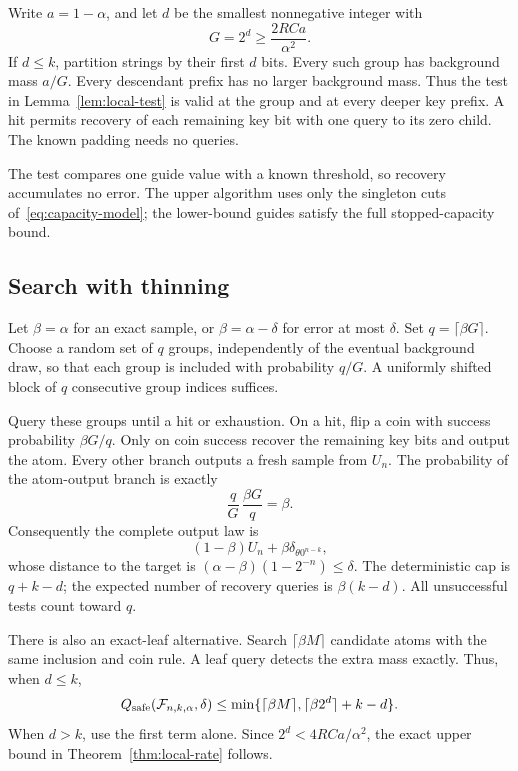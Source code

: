 Write $a=1-\alpha$, and let $d$ be the smallest nonnegative integer with
\begin{equation}\label{eq:resolution}
 G=2^d\ge \frac{2RCa}{\alpha^2}.
\end{equation}
If $d\le k$, partition strings by their first $d$ bits. Every such group has background mass $a/G$. Every descendant prefix has no larger background mass. Thus the test in Lemma~\ref{lem:local-test} is valid at the group and at every deeper key prefix. A hit permits recovery of each remaining key bit with one query to its zero child. The known padding needs no queries.

The test compares one guide value with a known threshold, so recovery accumulates no error. The upper algorithm uses only the singleton cuts of~\eqref{eq:capacity-model}; the lower-bound guides satisfy the full stopped-capacity bound.

\subsection{Search with thinning}
Let $\beta=\alpha$ for an exact sample, or $\beta=\alpha-\delta$ for error at most $\delta$. Set $q=\lceil\beta G\rceil$. Choose a random set of $q$ groups, independently of the eventual background draw, so that each group is included with probability $q/G$. A uniformly shifted block of $q$ consecutive group indices suffices.

Query these groups until a hit or exhaustion. On a hit, flip a coin with success probability $\beta G/q$. Only on coin success recover the remaining key bits and output the atom. Every other branch outputs a fresh sample from $U_n$. The probability of the atom-output branch is exactly
\begin{equation}\label{eq:branch-balance}
 \frac qG\,\frac{\beta G}{q}=\beta.
\end{equation}
Consequently the complete output law is
\begin{equation}\label{eq:local-output}
 (1-\beta)U_n+\beta\delta_{\theta0^{n-k}},
\end{equation}
whose distance to the target is $(\alpha-\beta)(1-2^{-n})\le\delta$. The deterministic cap is $q+k-d$; the expected number of recovery queries is $\beta(k-d)$. All unsuccessful tests count toward $q$.

There is also an exact-leaf alternative. Search $\lceil\beta M\rceil$ candidate atoms with the same inclusion and coin rule. A leaf query detects the extra mass exactly. Thus, when $d\le k$,
\begin{equation}\label{eq:local-cap}
 Q_{\mathrm{safe}}(\mathcal F_{n,k,\alpha},\delta)
 \le\min\{\lceil\beta M\rceil,\lceil\beta 2^d\rceil+k-d\}.
\end{equation}
When $d>k$, use the first term alone. Since $2^d<4RCa/\alpha^2$, the exact upper bound in Theorem~\ref{thm:local-rate} follows.



